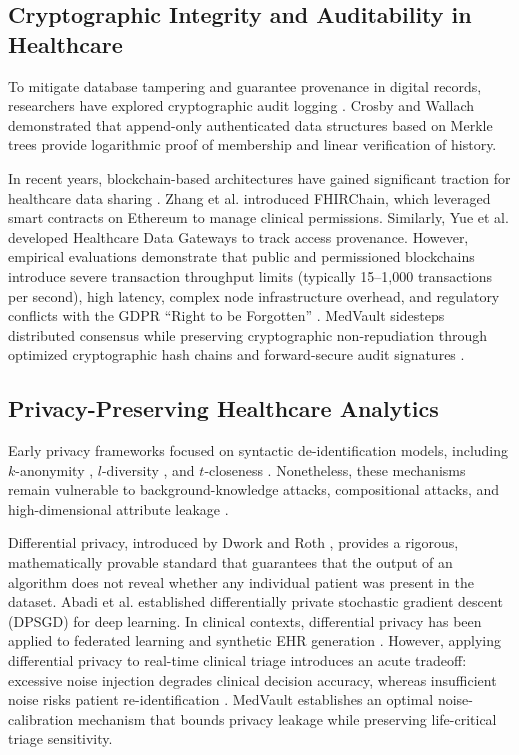 \documentclass[conference]{IEEEtran}
\begin{document}
\subsection{Cryptographic Integrity and Auditability in Healthcare}
To mitigate database tampering and guarantee provenance in digital records, researchers have explored cryptographic audit logging \cite{crosby2009efficient, miller2021auditability}. Crosby and Wallach \cite{crosby2009efficient} demonstrated that append-only authenticated data structures based on Merkle trees \cite{merkle1987digital} provide logarithmic proof of membership and linear verification of history. 

In recent years, blockchain-based architectures have gained significant traction for healthcare data sharing \cite{zhang2018blockchain, yue2016healthcare, eswaran2020patient, yang2020co}. Zhang et al. \cite{zhang2018blockchain} introduced FHIRChain, which leveraged smart contracts on Ethereum to manage clinical permissions. Similarly, Yue et al. \cite{yue2016healthcare} developed Healthcare Data Gateways to track access provenance. However, empirical evaluations demonstrate that public and permissioned blockchains introduce severe transaction throughput limits (typically 15--1,000 transactions per second), high latency, complex node infrastructure overhead, and regulatory conflicts with the GDPR ``Right to be Forgotten'' \cite{voigt2017eu, gordon2018blockchain}. MedVault sidesteps distributed consensus while preserving cryptographic non-repudiation through optimized cryptographic hash chains and forward-secure audit signatures \cite{sun2022privacy, lin2021secure}.

\subsection{Privacy-Preserving Healthcare Analytics}
Early privacy frameworks focused on syntactic de-identification models, including $k$-anonymity \cite{sweeney2002k}, $l$-diversity \cite{machanavajjhala2007l}, and $t$-closeness \cite{li2007t}. Nonetheless, these mechanisms remain vulnerable to background-knowledge attacks, compositional attacks, and high-dimensional attribute leakage \cite{dwork2014algorithmic}. 

Differential privacy, introduced by Dwork and Roth \cite{dwork2014algorithmic}, provides a rigorous, mathematically provable standard that guarantees that the output of an algorithm does not reveal whether any individual patient was present in the dataset. Abadi et al. \cite{abadi2016deep} established differentially private stochastic gradient descent (DPSGD) for deep learning. In clinical contexts, differential privacy has been applied to federated learning \cite{rieke2020future, kairouz2021advances, truong2020privacy} and synthetic EHR generation \cite{mayer2021synthetic, choi2017generating, beaulier2019data}. However, applying differential privacy to real-time clinical triage introduces an acute tradeoff: excessive noise injection degrades clinical decision accuracy, whereas insufficient noise risks patient re-identification \cite{li2022differential, chen2021differential}. MedVault establishes an optimal noise-calibration mechanism that bounds privacy leakage while preserving life-critical triage sensitivity.
\end{document}
